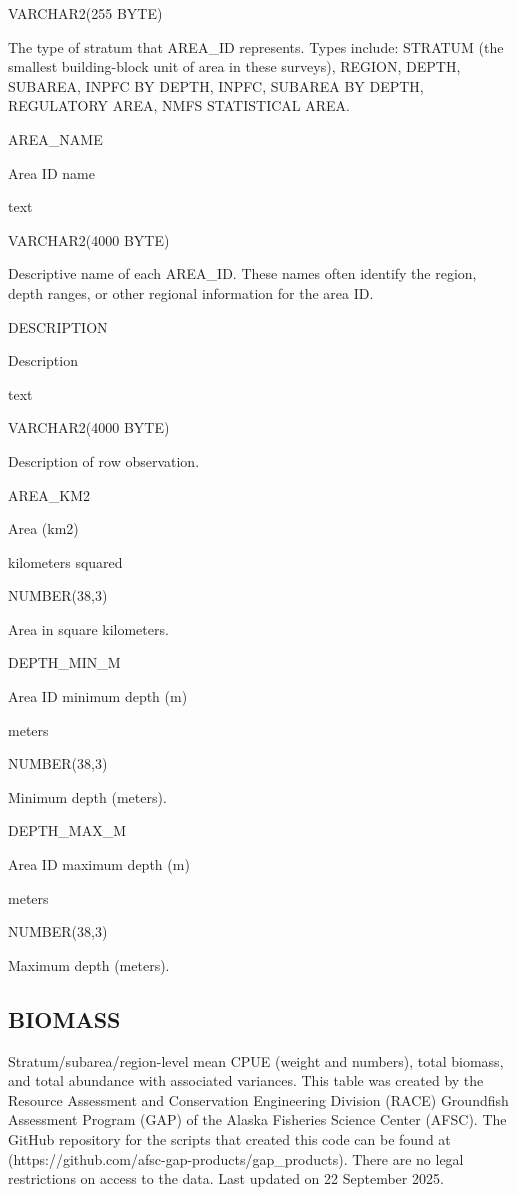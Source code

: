 \documentclass[
  letterpaper,
  oneside,
  open=any]{scrbook}
\begin{document}
VARCHAR2(255 BYTE)

The type of stratum that AREA\_ID represents. Types include: STRATUM
(the smallest building-block unit of area in these surveys), REGION,
DEPTH, SUBAREA, INPFC BY DEPTH, INPFC, SUBAREA BY DEPTH, REGULATORY
AREA, NMFS STATISTICAL AREA.

AREA\_NAME

Area ID name

text

VARCHAR2(4000 BYTE)

Descriptive name of each AREA\_ID. These names often identify the
region, depth ranges, or other regional information for the area ID.

DESCRIPTION

Description

text

VARCHAR2(4000 BYTE)

Description of row observation.

AREA\_KM2

Area (km2)

kilometers squared

NUMBER(38,3)

Area in square kilometers.

DEPTH\_MIN\_M

Area ID minimum depth (m)

meters

NUMBER(38,3)

Minimum depth (meters).

DEPTH\_MAX\_M

Area ID maximum depth (m)

meters

NUMBER(38,3)

Maximum depth (meters).

\subsection{BIOMASS}\label{biomass}

Stratum/subarea/region-level mean CPUE (weight and numbers), total
biomass, and total abundance with associated variances. This table was
created by the Resource Assessment and Conservation Engineering Division
(RACE) Groundfish Assessment Program (GAP) of the Alaska Fisheries
Science Center (AFSC). The GitHub repository for the scripts that
created this code can be found at
(https://github.com/afsc-gap-products/gap\_products). There are no legal
restrictions on access to the data. Last updated on 22 September 2025.
\end{document}
